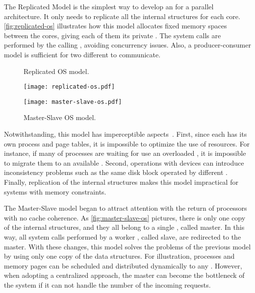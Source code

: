 			The Replicated Model is the simplest way to develop an \os for a
			parallel architecture.
			It only needs to replicate all the internal \os structures for each core.
			\autoref{fig:replicated-os} illustrates how this model allocates fixed memory spaces
			between the cores, giving each of them its private \os.
			The system calls are performed by the calling \cpu, avoiding concurrency issues.
			Also, a producer-consumer model is sufficient for two different \cpus to communicate.

			\begin{figure}[!tb]
				\centering

				\begin{minipage}{.47\textwidth}
					\centering
					\caption{Replicated OS model.}
					\label{fig:replicated-os}
					\texttt{[image: replicated-os.pdf]}
				\end{minipage}%
				\hfill%
				\begin{minipage}{.47\textwidth}
					\centering
					\caption{Master-Slave OS model.}
					\label{fig:master-slave-os}
					\texttt{[image: master-slave-os.pdf]}
				\end{minipage}%

			\end{figure}

			Notwithstanding, this model has imperceptible aspects~\cite{tanenbaum:4ed}.
			First, since each \cpu has its own process and page tables, it is impossible
			to optimize the use of resources.
			For instance, if many of processes are waiting for use an overloaded \cpu,
			it is impossible to migrate them to an available \cpu.
			Second, operations with \io devices can introduce inconsistency problems
			such as the same disk block operated by different \cpus.
			Finally, replication of the internal \os structures makes this model
			impractical for systems with memory constraints.

			The Master-Slave model began to attract attention with the return of
			processors with no cache coherence.
			As \autoref{fig:master-slave-os} pictures, there is only one copy of
			the internal \os structures, and they all belong to a single \cpu, called master.
			In this way, all system calls performed by a worker \cpu, called slave,
			are redirected to the master.
			With these changes, this model solves the problems of the previous model
			by using only one copy of the data structures.
			For illustration, processes and memory pages can be scheduled and
			distributed dynamically to any \cpus.
			However, when adopting a centralized approach, the master can become
			the bottleneck of the system if it can not handle the number of the
			incoming requests.

